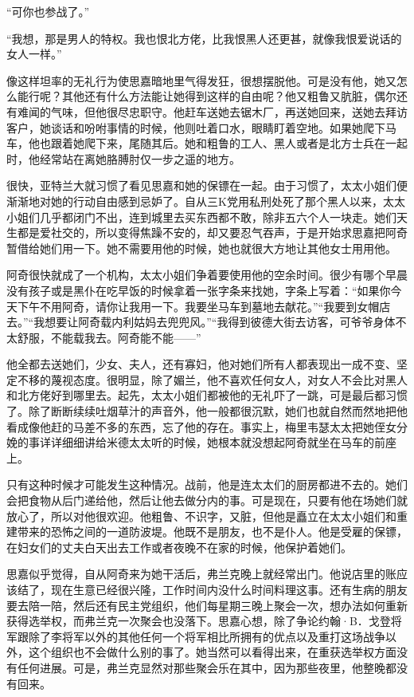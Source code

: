 \par “可你也参战了。”
\par “我想，那是男人的特权。我也恨北方佬，比我恨黑人还更甚，就像我恨爱说话的女人一样。”
\par 像这样坦率的无礼行为使思嘉暗地里气得发狂，很想摆脱他。可是没有他，她又怎么能行呢？其他还有什么方法能让她得到这样的自由呢？他又粗鲁又肮脏，偶尔还有难闻的气味，但他很尽忠职守。他赶车送她去锯木厂，再送她回来，送她去拜访客户，她谈话和吩咐事情的时候，他则吐着口水，眼睛盯着空地。如果她爬下马车，他也跟着她爬下来，尾随其后。她和粗鲁的工人、黑人或者是北方士兵在一起时，他经常站在离她胳膊肘仅一步之遥的地方。
\par 很快，亚特兰大就习惯了看见思嘉和她的保镖在一起。由于习惯了，太太小姐们便渐渐地对她的行动自由感到忌妒了。自从三K党用私刑处死了那个黑人以来，太太小姐们几乎都闭门不出，连到城里去买东西都不敢，除非五六个人一块走。她们天生都是爱社交的，所以变得焦躁不安的，却又要忍气吞声，于是开始求思嘉把阿奇暂借给她们用一下。她不需要用他的时候，她也就很大方地让其他女士用用他。
\par 阿奇很快就成了一个机构，太太小姐们争着要使用他的空余时间。很少有哪个早晨没有孩子或是黑仆在吃早饭的时候拿着一张字条来找她，字条上写着：“如果你今天下午不用阿奇，请你让我用一下。我要坐马车到墓地去献花。”“我要到女帽店去。”“我想要让阿奇载内利姑妈去兜兜风。”“我得到彼德大街去访客，可爷爷身体不太舒服，不能载我去。阿奇能不能——”
\par 他全都去送她们，少女、夫人，还有寡妇，他对她们所有人都表现出一成不变、坚定不移的蔑视态度。很明显，除了媚兰，他不喜欢任何女人，对女人不会比对黑人和北方佬好到哪里去。起先，太太小姐们都被他的无礼吓了一跳，可是最后都习惯了。除了断断续续吐烟草汁的声音外，他一般都很沉默，她们也就自然而然地把他看成像他赶的马差不多的东西，忘了他的存在。事实上，梅里韦瑟太太把她侄女分娩的事详详细细讲给米德太太听的时候，她根本就没想起阿奇就坐在马车的前座上。
\par 只有这种时候才可能发生这种情况。战前，他是连太太们的厨房都进不去的。她们会把食物从后门递给他，然后让他去做分内的事。可是现在，只要有他在场她们就放心了，所以对他很欢迎。他粗鲁、不识字，又脏，但他是矗立在太太小姐们和重建带来的恐怖之间的一道防波堤。他既不是朋友，也不是仆人。他是受雇的保镖，在妇女们的丈夫白天出去工作或者夜晚不在家的时候，他保护着她们。
\par 思嘉似乎觉得，自从阿奇来为她干活后，弗兰克晚上就经常出门。他说店里的账应该结了，现在生意已经很兴隆，工作时间内没什么时间料理这事。还有生病的朋友要去陪一陪，然后还有民主党组织，他们每星期三晚上聚会一次，想办法如何重新获得选举权，而弗兰克一次聚会也没落下。思嘉心想，除了争论约翰·B．戈登将军跟除了李将军以外的其他任何一个将军相比所拥有的优点以及重打这场战争以外，这个组织也不会做什么别的事了。她当然可以看得出来，在重获选举权方面没有任何进展。可是，弗兰克显然对那些聚会乐在其中，因为那些夜里，他整晚都没有回来。
